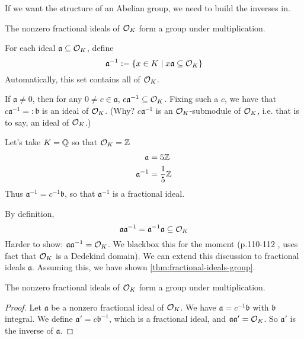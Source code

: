 If we want the structure of an Abelian group, we need to build the inverses in.
\begin{theorem}\label{thm:fractional-ideals-group}
    The nonzero fractional ideals of $\mathcal{O}_K$ form a group under multiplication.
\end{theorem}
For each ideal $\mathfrak{a}\subseteq \mathcal{O}_K$, define
\[\mathfrak{a}^{-1} := \left\{ x\in K\mid x\mathfrak{a}\subseteq \mathcal{O}_K \right\}\]
Automatically, this set contains all of $\mathcal{O}_K$.

If $\mathfrak{a}\neq 0$, then for any $0\neq c\in \mathfrak{a}$, $c\mathfrak{a}^{-1}\subseteq \mathcal{O}_K$. Fixing such a $c$, we have that $c\mathfrak{a}^{-1} =: \mathfrak{b}$ is an ideal of $\mathcal{O}_K$. (Why? $c\mathfrak{a}^{-1}$ is an $\mathcal{O}_K$-submodule of $\mathcal{O}_K$, i.e. that is to say, an ideal of $\mathcal{O}_K$.)

\begin{example}
    Let's take $K = \mathbb Q$ so that $\mathcal{O}_K = \mathbb Z$
    \begin{align*}
        \mathfrak{a}      & = 5\mathbb Z           \\
        \mathfrak{a}^{-1} & = \frac{1}{5}\mathbb Z
    \end{align*}
    Thus $\mathfrak{a}^{-1} = c^{-1}\mathfrak{b}$, so that $\mathfrak{a}^{-1}$ is a fractional ideal.
\end{example}

By definition,
\[\mathfrak{a}\mathfrak{a}^{-1} = \mathfrak{a}^{-1}\mathfrak{a} \subseteq \mathcal{O}_K\]
Harder to show: $\mathfrak{a}\mathfrak{a}^{-1} = \mathcal{O}_K$. We blackbox this for the moment (p.110-112 \cite{stewart2015algebraic}, uses fact that $\mathcal{O}_K$ is a Dedekind domain).
We can extend this discussion to fractional ideals $\mathfrak{a}$. Assuming this, we have shown \cref{thm:fractional-ideals-group}.

\begin{theorem*}
    The nonzero fractional ideals of $\mathcal{O}_K$ form a group under multiplication.
\end{theorem*}
\begin{proof}
    Let $\mathfrak{a}$ be a nonzero fractional ideal of $\mathcal{O}_K$. We have $\mathfrak{a} = c^{-1}\mathfrak{b}$ with $\mathfrak{b}$ integral. We define $\mathfrak{a}' = c\mathfrak{b}^{-1}$, which is a fractional ideal, and $\mathfrak{a}\mathfrak{a}' = \mathcal{O}_K$. So $\mathfrak{a}'$ is the inverse of $\mathfrak{a}$.
\end{proof}

